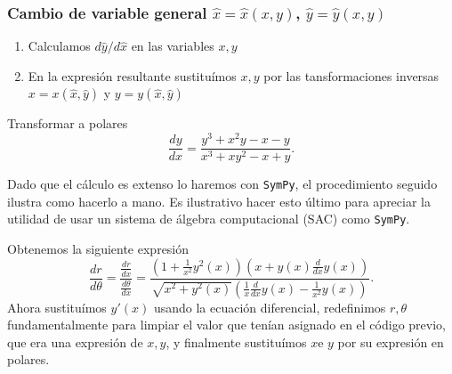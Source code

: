 \subsubsection{Cambio de variable general $\hat{x}=\hat{x}(x,y)$, $\hat{y}=\hat{y}(x,y)$}
\begin{enumerate}
  \item Calculamos $d\hat{y}/d\hat{x}$ en las variables $x,y$

   \item En la expresión resultante sustituímos $x,y$ por las tansformaciones 			inversas $x=x(\hat{x},\hat{y})$ y  $y=y(\hat{x},\hat{y})$
\end{enumerate}



\begin{ejemplo} Transformar a polares
 \[
  \frac{dy}{dx}=\frac{y^3+x^2y-x-y}{x^3+xy^2-x+y}.
 \]
\end{ejemplo}

Dado que el cálculo es extenso lo haremos con \texttt{SymPy}, el procedimiento seguido ilustra como hacerlo a mano. Es ilustrativo hacer esto último para apreciar la utilidad de usar un sistema de álgebra computacional (SAC) como \texttt{SymPy}.



Obtenemos la siguiente expresión 
\[\frac{dr}{d\theta}=\frac{\frac{dr}{dx}}{\frac{d\theta}{dx}}=\frac{\left(1 + \frac{1}{x^{2}} y^{2}{\left (x \right )}\right) \left(x + y{\left (x \right )} \frac{d}{d x} y{\left (x \right )}\right)}{\sqrt{x^{2} + y^{2}{\left (x \right )}} \left(\frac{1}{x} \frac{d}{d x} y{\left (x \right )} - \frac{1}{x^{2}} y{\left (x \right )}\right)}.\]
Ahora sustituímos $y'(x)$ usando la ecuación diferencial, redefinimos $r,\theta$ fundamentalmente para limpiar el valor que tenían asignado en el código previo, que era una expresión de $x,y$, y finalmente sustituímos $x$e $y$ por su expresión en polares. 

